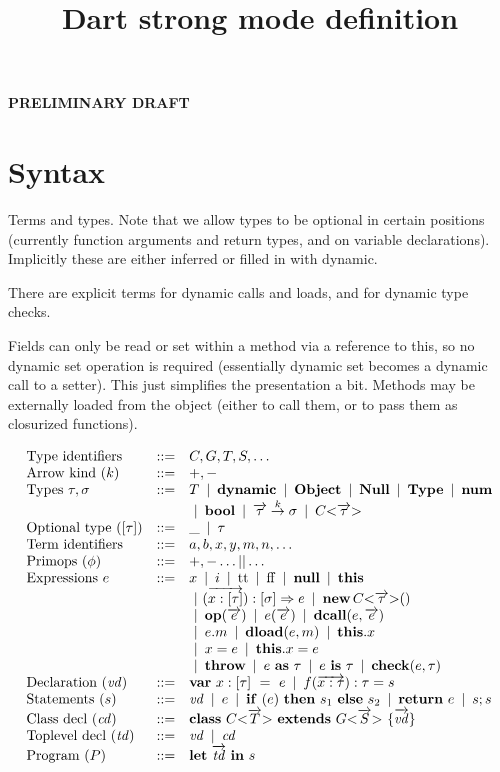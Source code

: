 \documentclass[fleqn, draft]{article}
\title{Dart strong mode definition}
\newcommand{\Arrow}[3][-]{#2 \overset{#1}{\rightarrow} #3}
\newcommand{\Bool}{\mathbf{bool}}
\newcommand{\Dynamic}{\mathbf{dynamic}}
\newcommand{\Null}{\mathbf{Null}}
\newcommand{\Num}{\mathbf{num}}
\newcommand{\Object}{\mathbf{Object}}
\newcommand{\TApp}[2]{#1\mathrm{<}#2\mathrm{>}}
\newcommand{\Type}{\mathbf{Type}}
\newcommand{\eassign}[2]{#1 = #2}
\newcommand{\eas}[2]{#1\ \mathbf{as}\ #2}
\newcommand{\echeck}[2]{\kwop{check}(#1, #2)}
\newcommand{\ecall}[2]{#1(#2)}
\newcommand{\edcall}[2]{\kwop{dcall}(#1, #2)}
\newcommand{\edload}[2]{\kwop{dload}(#1, #2)}
\newcommand{\eff}{\mathrm{ff}}
\newcommand{\eis}[2]{#1\ \mathbf{is}\ #2}
\newcommand{\elambda}[3]{(#1):#2 \Rightarrow #3}
\newcommand{\eload}[2]{#1.#2}
\newcommand{\eset}[3]{\eassign{#1.#2}{#3}}
\newcommand{\enew}[3]{\mathbf{new}\,\TApp{#1}{#2}(#3)}
\newcommand{\enull}{\mathbf{null}}
\newcommand{\eprim}{\kwop{op}}
\newcommand{\eprimapp}[2]{\ecall{#1}{#2}}
\newcommand{\ethis}{\mathbf{this}}
\newcommand{\ethrow}{\mathbf{throw}}
\newcommand{\ett}{\mathrm{tt}}
\newcommand{\kwclass}{\kw{class}}
\newcommand{\kwextends}{\kw{extends}}
\newcommand{\kwelse}{\kw{else}}
\newcommand{\kwif}{\kw{if}}
\newcommand{\kwin}{\kw{in}}
\newcommand{\kwlet}{\kw{let}}
\newcommand{\kwreturn}{\kw{return}}
\newcommand{\kwthen}{\kw{then}}
\newcommand{\kwvar}{\kw{var}}
\newcommand{\dclass}[3]{\kwclass\ #1\ \kwextends\ #2\ \{#3\}}
\newcommand{\dfun}[4]{#2(#3):#1 = #4}
\newcommand{\dvar}[2]{\kwvar\ #1\ =\ #2}
\newcommand{\sifthenelse}[3]{\kwif\ (#1)\ \kwthen\ #2\ \kwelse\ #3}
\newcommand{\sreturn}[1]{\kwreturn\ #1}
\newcommand{\program}[2]{\kwlet\ #1\ \kwin\ #2}
\newcommand{\many}[1]{\overrightarrow{#1}}
\newcommand{\alt}{\ \mathop{|}\ }
\newcommand{\opt}[1]{[#1]}
\begin{document}
\textbf{\large PRELIMINARY DRAFT}

\section*{Syntax}


Terms and types.  Note that we allow types to be optional in certain positions
(currently function arguments and return types, and on variable declarations).
Implicitly these are either inferred or filled in with dynamic.

There are explicit terms for dynamic calls and loads, and for dynamic type
checks.

Fields can only be read or set within a method via a reference to this, so no
dynamic set operation is required (essentially dynamic set becomes a dynamic
call to a setter).  This just simplifies the presentation a bit.  Methods may be
externally loaded from the object (either to call them, or to pass them as
closurized functions).

\[
\begin{array}{lcl}
\text{Type identifiers} & ::= &  C, G, T, S, \ldots \\
%
\text{Arrow kind ($k$)} & ::= &  +, -\\
%
\text{Types $\tau, \sigma$} & ::= &
 T \alt \Dynamic \alt \Object \alt \Null \alt \Type \alt \Num \\ &&
   \alt \Bool
   \alt \Arrow[k]{\many{\tau}}{\sigma} \alt \TApp{C}{\many{\tau}} \\
%
\text{Optional type ($[\tau]$)} & ::= &  \_ \alt \tau \\
%
\text{Term identifiers} & ::= & a, b, x, y, m, n, \ldots \\
%
\text{Primops ($\phi$)} & ::= & \mathrm{+}, \mathrm{-} \ldots \mathrm{||} \ldots \\
%
\text{Expressions $e$} & ::= & 
 x \alt i \alt \ett \alt \eff \alt \enull \alt \ethis \\&&
   \alt \elambda{\many{x:\opt{\tau}}}{\opt{\sigma}}{e} 
   \alt \enew{C}{\many{\tau}}{} \\&&
   \alt \eprimapp{\eprim}{\many{e}} \alt \ecall{e}{\many{e}} 
   \alt \edcall{e}{\many{e}}  \\&&
   \alt \eload{e}{m} \alt \edload{e}{m} \alt \eload{\ethis}{x} \\&&
   \alt \eassign{x}{e} \alt \eset{\ethis}{x}{e} \\&&
   \alt \ethrow \alt \eas{e}{\tau} \alt \eis{e}{\tau} \alt \echeck{e}{\tau}\\
%
\text{Declaration ($\mathit{vd}$)} & ::= &
   \dvar{x:\opt{\tau}}{e} \alt \dfun{\tau}{f}{\many{x:\tau}}{s} \\
%
\text{Statements ($s$)} & ::= & \mathit{vd} \alt e \alt \sifthenelse{e}{s_1}{s_2} 
   \alt \sreturn{e} \alt s;s \\
%
\text{Class decl ($\mathit{cd}$)} & ::= & \dclass{\TApp{C}{\many{T}}}{\TApp{G}{\many{S}}}{\many{\mathit{vd}}} \\
%
\text{Toplevel decl ($\mathit{td}$)} & ::= & \mathit{vd} \alt \mathit{cd}\\
%
\text{Program ($P$)} & ::= & \program{\many{\mathit{td}}}{s}
\end{array}
\]
\end{document}
